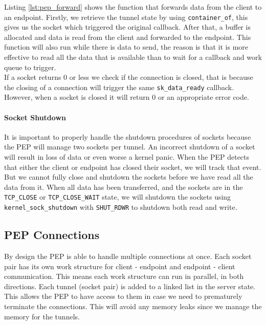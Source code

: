 \documentclass[a4paper,english, 12pt]{report}
\begin{document}
Listing \ref{lst:pep_forward} shows the function that forwards data from the client to an endpoint. Firstly, we retrieve the tunnel state by using \verb|container_of|, this gives us the socket which triggered the original callback. After that, a buffer is allocated and data is read from the client and forwarded to the endpoint. This function will also run while there is data to send, the reason is that it is more effective to read all the data that is available than to wait for a callback and work queue to trigger.\\

If a socket returns 0 or less we check if the connection is closed, that is because the closing of a connection will trigger the same \verb|sk_data_ready| callback. However, when a socket is closed it will return 0 or an appropriate error code.\\

\paragraph{Socket Shutdown}
It is important to properly handle the shutdown procedures of sockets because the PEP will manage two sockets per tunnel. An incorrect shutdown of a socket will result in loss of data or even worse a kernel panic. When the PEP detects that either the client or endpoint has closed their socket, we will track that event. But we cannot fully close and shutdown the sockets before we have read all the data from it. When all data has been transferred, and the sockets are in the \verb|TCP_CLOSE| or \verb|TCP_CLOSE_WAIT| state, we will shutdown the sockets using \verb|kernel_sock_shutdown| with \verb|SHUT_RDWR| to shutdown both read and write.\\

\subsection{PEP Connections}
By design the PEP is able to handle multiple connections at once. Each socket pair has its own work structure for client - endpoint and endpoint - client communication. This means each work structure can run in parallel, in both directions. Each tunnel (socket pair) is added to a linked list in the server state. This allows the PEP to have access to them in case we need to prematurely terminate the connections. This will avoid any memory leaks since we manage the memory for the tunnels.\\
\end{document}
